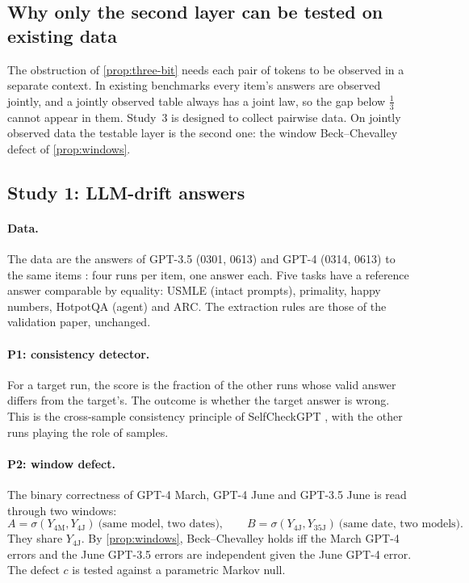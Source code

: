 \documentclass[11pt]{article}
\theoremstyle{definition}
\begin{document}
\subsection{Why only the second layer can be tested on existing data}
The obstruction of \cref{prop:three-bit} needs each pair of tokens to be observed in a separate context. In existing benchmarks every
item's answers are observed jointly, and a jointly observed table always has a joint law, so the gap below $\tfrac13$ cannot appear in
them. Study~3 is designed to collect pairwise data. On jointly observed data the testable layer is the second one: the window
Beck--Chevalley defect of \cref{prop:windows}.

\subsection{Study 1: LLM-drift answers}
\paragraph{Data.} The data are the answers of GPT-3.5 (0301, 0613) and GPT-4 (0314, 0613) to the same items \cite{ChenZaharia2024}:
four runs per item, one answer each. Five tasks have a reference answer comparable by equality: USMLE (intact prompts), primality,
happy numbers, HotpotQA (agent) and ARC. The extraction rules are those of the validation paper, unchanged.

\paragraph{P1: consistency detector.} For a target run, the score is the fraction of the other runs whose valid answer differs from the
target's. The outcome is whether the target answer is wrong. This is the cross-sample consistency principle of SelfCheckGPT
\cite{Manakul2023}, with the other runs playing the role of samples.

\paragraph{P2: window defect.} The binary correctness of GPT-4 March, GPT-4 June and GPT-3.5 June is read through two windows:
\[
A=\sigma(Y_{\mathrm{4M}},Y_{\mathrm{4J}})\ \text{(same model, two dates)},\qquad B=\sigma(Y_{\mathrm{4J}},Y_{\mathrm{35J}})\ \text{(same date, two models)}.
\]
They share $Y_{\mathrm{4J}}$. By \cref{prop:windows}, Beck--Chevalley holds iff the March GPT-4 errors and the June GPT-3.5 errors are
independent given the June GPT-4 error. The defect $c$ is tested against a parametric Markov null.
\end{document}
